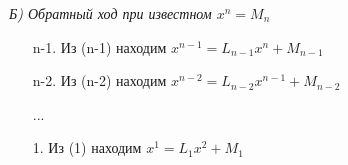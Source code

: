 \documentclass[__main__.tex]{subfiles}
\begin{document}
\textit{Б) Обратный ход при известном $x^n = M_n$}
\begin{enumerate}
	\item[n-1.]
	Из (n-1) находим $x^{n-1} = L_{n-1} x^n + M_{n-1}$
	
	\item[n-2.]
	Из (n-2) находим $x^{n-2} = L_{n-2} x^{n-1} + M_{n-2}$
	
	...
	
	\item[1.]
	Из (1) находим $x^{1} = L_{1} x^{2} + M_{1}$
\end{enumerate}
\end{document}
